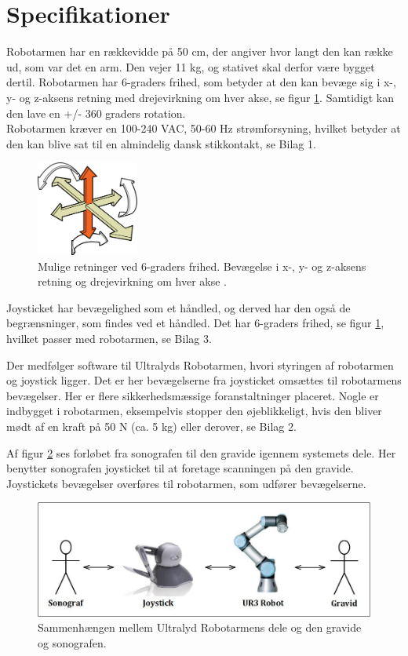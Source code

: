 \newpage
\section{Specifikationer}
Robotarmen har en rækkevidde på 50 cm, der angiver hvor langt den kan række ud, som var det en arm. Den vejer 11 kg, og stativet skal derfor være bygget dertil. Robotarmen har 6-graders frihed, som betyder at den kan bevæge sig i x-, y- og z-aksens retning med drejevirkning om hver akse, se figur \ref{seksgradersfrihed}. Samtidigt kan den lave en +/- 360 graders rotation. \\
Robotarmen kræver en 100-240 VAC, 50-60 Hz strømforsyning, hvilket betyder at den kan blive sat til en almindelig dansk stikkontakt, se Bilag 1.
\begin{figure}[H]\centering
	\includegraphics[width = 0.3\textwidth]{Figurer/sixDegressOfFreedom.jpg}
	\caption{Mulige retninger ved 6-graders frihed. Bevægelse i x-, y- og z-aksens retning og drejevirkning om hver akse \cite{6gradersfrihed}. }
	\label{seksgradersfrihed}
\end{figure}
Joysticket har bevægelighed som et håndled, og derved har den også de begrænsninger, som findes ved et håndled. Det har 6-graders frihed, se figur \ref{seksgradersfrihed}, hvilket passer med robotarmen, se Bilag 3. 

Der medfølger software til Ultralyds Robotarmen, hvori styringen af robotarmen og joystick ligger. Det er her bevægelserne fra joysticket omsættes til robotarmens bevægelser. Her er flere sikkerhedsmæssige foranstaltninger placeret. Nogle er indbygget i robotarmen, eksempelvis stopper den øjeblikkeligt, hvis den bliver mødt af en kraft på 50 N (ca. 5 kg) eller derover, se Bilag 2.    

Af figur \ref{system} ses forløbet fra sonografen til den gravide igennem systemets dele. Her benytter sonografen joysticket til at foretage scanningen på den gravide. Joystickets bevægelser overføres til robotarmen, som udfører bevægelserne.

\begin{figure}[H]\centering
	\includegraphics[width = 1.0\textwidth]{Figurer/teknologi.jpg}
	\caption{Sammenhængen mellem Ultralyd Robotarmens dele og den gravide og sonografen.}
	\label{system}
\end{figure}

